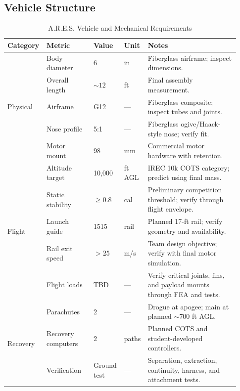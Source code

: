 \documentclass[11pt]{IEEEtran}
\newcommand{\ares}{A.R.E.S.}
\begin{document}
\subsection{Vehicle Structure}
\begin{table}[H]
\centering\small
\begin{tabular}{@{}p{0.13\linewidth}p{0.20\linewidth}p{0.13\linewidth}p{0.08\linewidth}p{0.39\linewidth}@{}}
\toprule
\textbf{Category} & \textbf{Metric} & \textbf{Value} & \textbf{Unit} & \textbf{Notes}\\
\midrule
\multirow{5}{*}{Physical}
 & Body diameter & 6 & in & Fiberglass airframe; inspect dimensions.\\ \cmidrule{2-5}
 & Overall length & $\sim 12$ & ft & Final assembly measurement.\\ \cmidrule{2-5}
 & Airframe & G12 & --- & Fiberglass composite; inspect tubes and joints.\\ \cmidrule{2-5}
 & Nose profile & 5:1 & --- & Fiberglass ogive/Haack-style nose; verify fit.\\ \cmidrule{2-5}
 & Motor mount & 98 & mm & Commercial motor hardware with retention.\\
\midrule
\multirow{5}{*}{Flight}
 & Altitude target & 10,000 & ft AGL & IREC 10k COTS category; predict using final mass.\\ \cmidrule{2-5}
 & Static stability & $\geq 0.8$ & cal & Preliminary competition threshold; verify through flight envelope.\\ \cmidrule{2-5}
 & Launch guide & 1515 & rail & Planned 17-ft rail; verify geometry and availability.\\ \cmidrule{2-5}
 & Rail exit speed & $>25$ & m/s & Team design objective; verify with final motor simulation.\\ \cmidrule{2-5}
 & Flight loads & TBD & --- & Verify critical joints, fins, and payload mounts through FEA and tests.\\
\midrule
\multirow{3}{*}{Recovery}
 & Parachutes & 2 & --- & Drogue at apogee; main at planned $\sim700$ ft AGL.\\ \cmidrule{2-5}
 & Recovery computers & 2 & paths & Planned COTS and student-developed controllers.\\ \cmidrule{2-5}
 & Verification & Ground test & --- & Separation, extraction, continuity, harness, and attachment tests.\\
\bottomrule
\end{tabular}
\vspace{3mm}
\caption{\ares{} Vehicle and Mechanical Requirements}
\label{tab:ARES_Requirements_Table}
\end{table}
\end{document}
